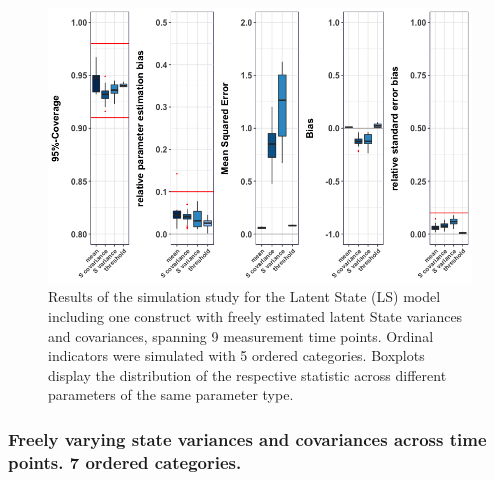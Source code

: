  \begin{figure}[H]
 \begin{adjustwidth}{-1cm}{-1cm}
    \begin{center}
  \includegraphics[width=1\textwidth]{Boxplot_LatentState_freeSvar_5categ.png}
   \end{center}
    \end{adjustwidth}
      \captionsetup{skip=10pt,width=1.05\textwidth}
\caption[Results LS 5 categ]{Results of the simulation study for the Latent State (LS) model including one construct with freely estimated latent State variances and covariances, spanning 9 measurement time points. Ordinal indicators were simulated with 5 ordered categories. Boxplots display the distribution of the respective statistic across different parameters of the same parameter type.}
\label{Fig: LS one free 5 categ}
\end{figure}

  \subsubsection{Freely varying state variances and covariances across time points. 7 ordered categories.}
  
